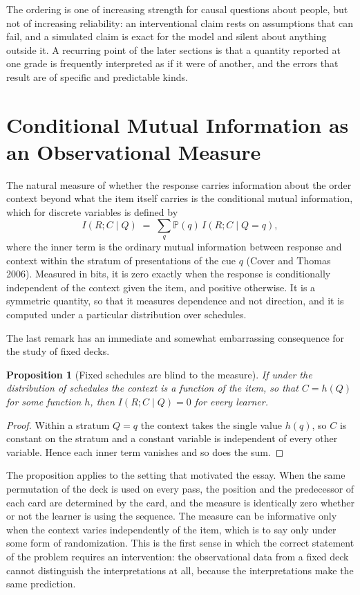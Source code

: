 \documentclass[11pt]{article}
\newtheorem{proposition}{Proposition}
\theoremstyle{remark}
\renewcommand{\Pr}{\mathbb{P}}
\begin{document}
The ordering is one of increasing strength for causal questions about people, but not of increasing reliability: an interventional claim rests on assumptions that can fail, and a simulated claim is exact for the model and silent about anything outside it. A recurring point of the later sections is that a quantity reported at one grade is frequently interpreted as if it were of another, and the errors that result are of specific and predictable kinds.

\section{Conditional Mutual Information as an Observational Measure}

The natural measure of whether the response carries information about the order context beyond what the item itself carries is the conditional mutual information, which for discrete variables is defined by
\[
I(R;C\mid Q) \;=\; \sum_{q} \Pr(q)\, I(R;C\mid Q=q),
\]
where the inner term is the ordinary mutual information between response and context within the stratum of presentations of the cue $q$ (Cover and Thomas 2006). Measured in bits, it is zero exactly when the response is conditionally independent of the context given the item, and positive otherwise. It is a symmetric quantity, so that it measures dependence and not direction, and it is computed under a particular distribution over schedules.

The last remark has an immediate and somewhat embarrassing consequence for the study of fixed decks.

\begin{proposition}[Fixed schedules are blind to the measure]
If under the distribution of schedules the context is a function of the item, so that $C = h(Q)$ for some function $h$, then $I(R;C\mid Q)=0$ for every learner.
\end{proposition}

\begin{proof}
Within a stratum $Q=q$ the context takes the single value $h(q)$, so $C$ is constant on the stratum and a constant variable is independent of every other variable. Hence each inner term vanishes and so does the sum.
\end{proof}

The proposition applies to the setting that motivated the essay. When the same permutation of the deck is used on every pass, the position and the predecessor of each card are determined by the card, and the measure is identically zero whether or not the learner is using the sequence. The measure can be informative only when the context varies independently of the item, which is to say only under some form of randomization. This is the first sense in which the correct statement of the problem requires an intervention: the observational data from a fixed deck cannot distinguish the interpretations at all, because the interpretations make the same prediction.
\end{document}
